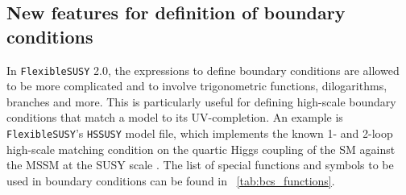 \documentclass[final,3p,11pt,pdflatex]{elsarticle}
\makeatletter
\newcommand{\modelname}[1]{\texttt{#1}\@\xspace}
\newcommand{\fs}{\texttt{FlexibleSUSY}\@\xspace}
\newcommand{\HSSUSY}{\modelname{HSSUSY}}
\newcommand{\fstwo}{\fs 2.0\@\xspace}
\newcommand{\tabref}[1]{\tablename~\ref{#1}}
\makeatother
\begin{document}
\subsection{New features for definition of boundary conditions}
In \fstwo, the expressions to define boundary conditions are allowed
to be more complicated and to involve trigonometric functions,
dilogarithms, branches and more.  This is particularly useful for defining
high-scale boundary conditions that match a model to its UV-completion.  An
example is \fs's \HSSUSY model file, which implements the known
1- and 2-loop high-scale matching condition on the quartic Higgs
coupling of the SM against the MSSM at the SUSY scale
\cite{Bagnaschi:2014rsa,Vega:2015fna,Bagnaschi:2017xid}.  The list of
special functions and symbols to be used in boundary conditions can be
found in \tabref{tab:bcs_functions}.
%
\end{document}
